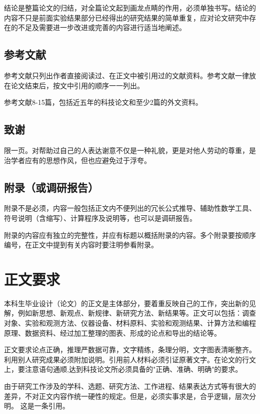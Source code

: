 \documentclass[
	StudentName     = 姓名,
	StudentID       = 学号,
	AdvisorName     = 指导教师,
	Grade           = 年级,
	Major           = 专业,
	Department      = 一个很长很长的名字,
	SubmitYear		= 2022,
	SubmitMonth		= 5,
	Title           = 论文中文题目,
	TitleEng        = {{English Title}}
]{cauc_thesis}
\begin{document}
	结论是整篇论文的归结，对全篇论文起到画龙点睛的作用，必须单独书写。结论的内容不只是前面实验结果部分已经得出的研究结果的简单重复，应对论文研究中存在的不足及需要进一步改进或完善的内容进行适当地阐述。
	
	\section{参考文献}
	
	参考文献只列出作者直接阅读过、在正文中被引用过的文献资料。参考文献一律放在论文结束后，按文中引用的顺序一一列出。
	
	参考文献8-15篇，包括近五年的科技论文和至少2篇的外文资料。
	\section{致谢}
	
	限一页。对帮助过自己的人表达谢意不仅是一种礼貌，更是对他人劳动的尊重，是治学者应有的思想作风，但也应避免过于浮夸。
	
	\section{附录（或调研报告）}
	
	附录不是必须，内容一般包括正文内不便列出的冗长公式推导、辅助性数学工具、符号说明（含缩写）、计算程序及说明等，也可以是调研报告。
	
	附录的内容应有独立的完整性，并应有标题以概括附录的内容。多个附录要按顺序编号，在正文中提到有关内容时要注明参看附录。
	
	{\centering\chapter{正文要求}}
	
	本科生毕业设计（论文）的正文是主体部分，要着重反映自己的工作，突出新的见解，例如新思想、新观点、新规律、新研究方法、新结果等。正文可以包括：调查对象、实验和观测方法、仪器设备、材料原料、实验和观测结果、计算方法和编程原理、数据资料、经过加工整理的图表、形成的论点和导出的结论等。
	
	正文要求论点正确，推理严数据可靠，文字精练，条理分明，文字图表清晰整齐。利用别人研究成果必须附加说明。引用前人材料必须引证原著文字。在论文的行文上，要注意语句通顺,达到科技论文所必须具备的"正确、准确、明确"的要求。
	
	由于研究工作涉及的学科、选题、研究方法、工作进程、结果表达方式等有很大的差异，不对正文内容作统一硬性的规定。但是，必须实事求是，合乎逻辑，层次分明。
	这是一条引用\cite{Byrne2003AUT}。
\end{document}
